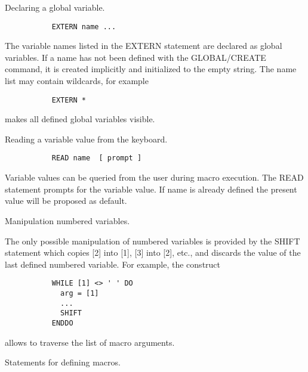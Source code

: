    \par
Declaring a global variable.  

\begin{verbatim}
           EXTERN name ...
\end{verbatim}
\ENDVERB
   \par
The variable names listed in the EXTERN statement are declared as global 
   variables.  If a name has not been defined with the GLOBAL/CREATE command, 
   it is created implicitly and initialized to the empty string.  The name 
   list may contain wildcards, for example 

\begin{verbatim}
           EXTERN *
\end{verbatim}
\ENDVERB
   \par
makes all defined global variables visible.  

\ENDCMD


   \par
Reading a variable value from the keyboard.  

\begin{verbatim}
           READ name  [ prompt ]
\end{verbatim}
\ENDVERB
   \par
Variable values can be queried from the user during macro execution. The 
   READ statement prompts for the variable value. If name is already defined 
   the present value will be proposed as default.  

\ENDCMD


   \par
Manipulation numbered variables.  

   \par
The only possible manipulation of numbered variables is provided by the 
   SHIFT statement which copies [2] into [1], [3] into [2], etc., and discards 
   the value of the last defined numbered variable. For example, the construct 

\begin{verbatim}
           WHILE [1] <> ' ' DO
             arg = [1]
             ...
             SHIFT
           ENDDO
\end{verbatim}
\ENDVERB
   \par
allows to traverse the list of macro arguments.  

\ENDCMD
{}
\ifMENUtext
   \par
Statements for defining macros.  


